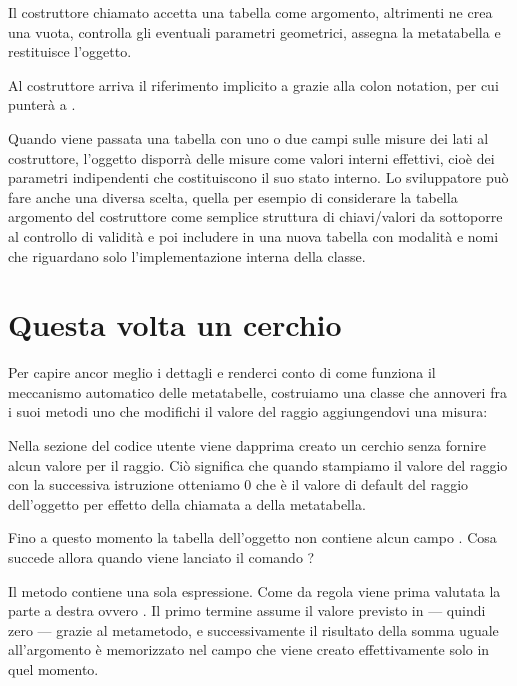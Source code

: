 Il costruttore chiamato  accetta una tabella come argomento, altrimenti
ne crea una vuota, controlla gli eventuali parametri geometrici, assegna la
metatabella e restituisce l'oggetto.

Al costruttore  arriva il riferimento implicito a 
grazie alla colon notation, per cui  punterà a .

Quando viene passata una tabella con uno o due campi sulle misure dei lati al
costruttore, l'oggetto disporrà delle misure come valori interni effettivi,
cioè dei parametri indipendenti che costituiscono il suo stato interno. Lo
sviluppatore può fare anche una diversa scelta, quella per esempio di
considerare la tabella argomento del costruttore come semplice struttura di
chiavi/valori da sottoporre al controllo di validità e poi includere in una
nuova tabella con modalità e nomi che riguardano solo l'implementazione interna
della classe.


\section{Questa volta un cerchio}

Per capire ancor meglio i dettagli e renderci conto di come funziona il
meccanismo automatico delle metatabelle, costruiamo una classe 
che annoveri fra i suoi metodi uno che modifichi il valore del raggio
aggiungendovi una misura:

Nella sezione del codice utente viene dapprima creato un cerchio senza fornire
alcun valore per il raggio. Ciò significa che quando stampiamo il valore del
raggio con la successiva istruzione otteniamo 0 che è il valore di default del
raggio dell'oggetto  per effetto della chiamata a 
della metatabella.

Fino a questo momento la tabella dell'oggetto  non contiene alcun campo
. Cosa succede allora quando viene lanciato il comando
?

Il metodo  contiene una sola espressione. Come da regola viene
prima valutata la parte a destra ovvero . Il primo termine
assume il valore previsto in  --- quindi zero --- grazie al
metametodo, e successivamente il risultato della somma uguale all'argomento
 è memorizzato nel campo  che viene creato effettivamente
solo in quel momento.



